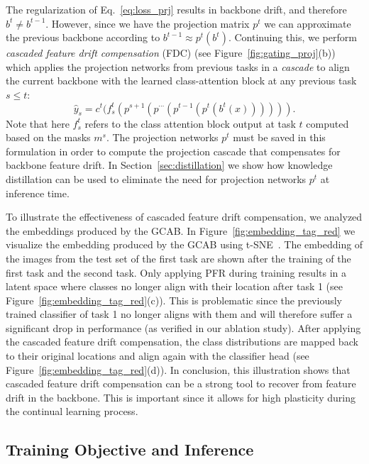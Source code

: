 \documentclass[twocolumn]{svjour3}          %
\begin{document}
The regularization of Eq.~\ref{eq:loss_prj} results in backbone drift, and therefore $b^t \neq b^{t-1}$. However, since we have the projection matrix $p^t$ we can approximate the previous backbone according to $b^{t-1}\approx p^t(b^t)$. Continuing this, we perform \emph{cascaded feature drift compensation} (FDC) (see Figure~\ref{fig:gating_proj}(b)) which applies the projection networks from previous tasks in a \emph{cascade} to align the current backbone with the learned class-attention block at any previous task $s \le t$:
\begin{equation}
    \hat y_{s}=c^t(f^t_s(p^{s+1}(p^{\cdots}(p^{t-1}(p^t(b^t(x)))))).
\label{eq:projection}
\end{equation}
Note that here $f_s^t$ refers to the class attention  block output at task $t$ computed based on the masks $m^s$. The projection networks $p^t$ must be saved in this formulation in order to compute the projection cascade that compensates for backbone feature drift. In Section~\ref{sec:distillation} we show how knowledge distillation can be used to eliminate the need for projection networks $p^t$ at inference time. 

To illustrate the effectiveness of cascaded feature drift compensation, we analyzed the embeddings produced by the GCAB. In Figure~\ref{fig:embedding_tag_red} we visualize the embedding produced by the GCAB using t-SNE~\citep{van2008visualizing}. 
The embedding of the images from the test set of the first task are shown after the training of the first task and the second task.
Only applying PFR during training results in a latent space where classes no longer align with their location after task 1 (see Figure~\ref{fig:embedding_tag_red}(c)). This is problematic since the previously trained classifier of task 1 no longer aligns with them and will therefore suffer a significant drop in performance (as verified in our ablation study). After applying the cascaded feature drift compensation, the class distributions are mapped back to their original locations and align again with the classifier head (see Figure~\ref{fig:embedding_tag_red}(d)). In conclusion, this illustration shows that cascaded feature drift compensation can be a strong tool to recover from feature drift in the backbone. This is important since it allows for high plasticity during the continual learning process.

\subsection{Training Objective and Inference}
\end{document}
